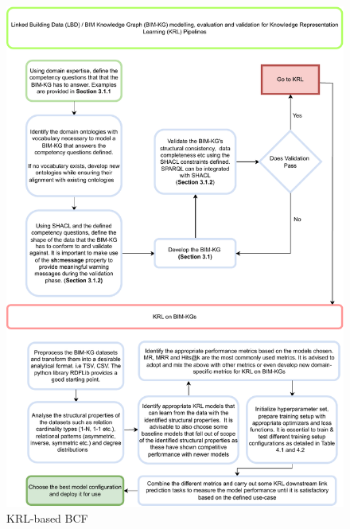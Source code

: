 \begin{figure}[!t]
        \centering
        \includegraphics[width=1\textwidth]{figures/LBD-KRL Framework.pdf}
        \caption{KRL-based BCF}\label{KRL-based BCF Chart}
    \end{figure}

